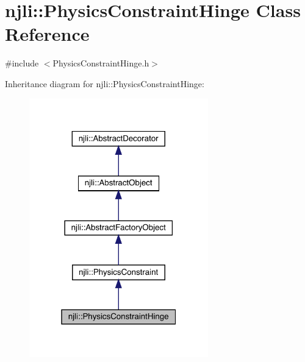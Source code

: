 \hypertarget{classnjli_1_1_physics_constraint_hinge}{}\section{njli\+:\+:Physics\+Constraint\+Hinge Class Reference}
\label{classnjli_1_1_physics_constraint_hinge}


{\ttfamily \#include $<$Physics\+Constraint\+Hinge.\+h$>$}



Inheritance diagram for njli\+:\+:Physics\+Constraint\+Hinge\+:\nopagebreak
\begin{figure}[H]
\begin{center}
\leavevmode
\includegraphics[width=220pt]{classnjli_1_1_physics_constraint_hinge__inherit__graph}
\end{center}
\end{figure}


